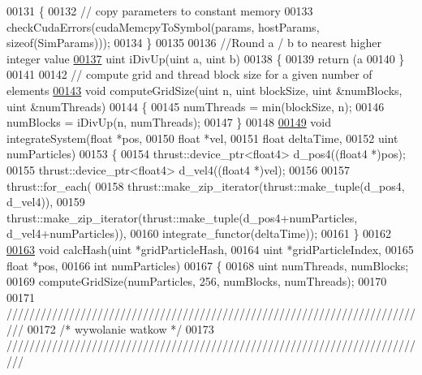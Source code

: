 \begin{DoxyCode}
00131     \{
00132         \textcolor{comment}{// copy parameters to constant memory}
00133         checkCudaErrors(cudaMemcpyToSymbol(params, hostParams, \textcolor{keyword}{sizeof}(SimParams)));
00134     \}
00135 
00136     \textcolor{comment}{//Round a / b to nearest higher integer value}
\hypertarget{particle_system__cuda_8cu_source_l00137}{}\hyperlink{particle_system__cuda_8cu_aa5accec7fb28381615c8cb68522c9eb3}{00137}     uint iDivUp(uint a, uint b)
00138     \{
00139         \textcolor{keywordflow}{return} (a %
00140     \}
00141 
00142     \textcolor{comment}{// compute grid and thread block size for a given number of elements}
\hypertarget{particle_system__cuda_8cu_source_l00143}{}\hyperlink{particle_system__cuda_8cu_a78e8aa50e0629b57cff219a2fa753ed0}{00143}     \textcolor{keywordtype}{void} computeGridSize(uint n, uint blockSize, uint &numBlocks, uint &numThreads)
00144     \{
00145         numThreads = min(blockSize, n);
00146         numBlocks = iDivUp(n, numThreads);
00147     \}
00148 
\hypertarget{particle_system__cuda_8cu_source_l00149}{}\hyperlink{particle_system__cuda_8cu_a34e9db8b801cd537e5ae5a4a886e020c}{00149}     \textcolor{keywordtype}{void} integrateSystem(\textcolor{keywordtype}{float} *pos,
00150                          \textcolor{keywordtype}{float} *vel,
00151                          \textcolor{keywordtype}{float} deltaTime,
00152                          uint numParticles)
00153     \{
00154         thrust::device\_ptr<float4> d\_pos4((float4 *)pos);
00155         thrust::device\_ptr<float4> d\_vel4((float4 *)vel);
00156 
00157         thrust::for\_each(
00158             thrust::make\_zip\_iterator(thrust::make\_tuple(d\_pos4, d\_vel4)),
00159             thrust::make\_zip\_iterator(thrust::make\_tuple(d\_pos4+numParticles, d\_vel4+numParticles)),
00160             integrate\_functor(deltaTime));
00161     \}
00162 
\hypertarget{particle_system__cuda_8cu_source_l00163}{}\hyperlink{particle_system__cuda_8cu_ae0a4037d25e768622443077546399cf2}{00163}     \textcolor{keywordtype}{void} calcHash(uint  *gridParticleHash,
00164                   uint  *gridParticleIndex,
00165                   \textcolor{keywordtype}{float} *pos,
00166                   \textcolor{keywordtype}{int}    numParticles)
00167     \{
00168         uint numThreads, numBlocks;
00169         computeGridSize(numParticles, 256, numBlocks, numThreads);
00170 
00171 \textcolor{comment}{///////////////////////////////////////////////////////////////////////////}
00172 \textcolor{comment}{/*      wywolanie watkow        */}
00173 \textcolor{comment}{///////////////////////////////////////////////////////////////////////////}

\end{DoxyCode}

